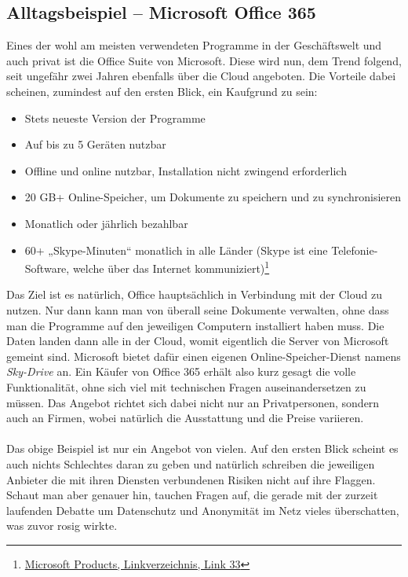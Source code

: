 \subsection{Alltagsbeispiel – Microsoft Office 365}
Eines der wohl am meisten verwendeten Programme in der Geschäftswelt und auch privat ist die Office Suite von Microsoft. Diese wird nun, dem Trend folgend, seit ungefähr zwei Jahren ebenfalls über die Cloud angeboten. Die Vorteile dabei scheinen, zumindest auf den ersten Blick, ein Kaufgrund zu sein:

\begin{itemize}
\item Stets neueste Version der Programme
\item Auf bis zu 5 Geräten nutzbar
\item Offline und online nutzbar, Installation nicht zwingend erforderlich
\item 20 GB+ Online-Speicher, um Dokumente zu speichern und zu synchronisieren
\item Monatlich oder jährlich bezahlbar
\item 60+ „Skype-Minuten“ monatlich in alle Länder (Skype ist eine Telefonie-Software, welche über das Internet kommuniziert)\footnote{\hyperlink{link33}{Microsoft Products, Linkverzeichnis, Link 33}}
\end{itemize}

Das Ziel ist es natürlich, Office hauptsächlich in Verbindung mit der Cloud zu nutzen. Nur dann kann man von überall seine Dokumente verwalten, ohne dass man die Programme auf den jeweiligen Computern installiert haben muss. Die Daten landen dann alle in der Cloud, womit eigentlich die Server von Microsoft gemeint sind. Microsoft bietet dafür einen eigenen Online-Speicher-Dienst namens \textit{Sky-Drive} an. Ein Käufer von Office 365 erhält also kurz gesagt die volle Funktionalität, ohne sich viel mit technischen Fragen auseinandersetzen zu müssen. Das Angebot richtet sich dabei nicht nur an Privatpersonen, sondern auch an Firmen, wobei natürlich die Ausstattung und die Preise variieren.
\\
\\
Das obige Beispiel ist nur ein Angebot von vielen. Auf den ersten Blick scheint es auch nichts Schlechtes daran zu geben und natürlich schreiben die jeweiligen Anbieter die mit ihren Diensten verbundenen Risiken nicht auf ihre Flaggen. Schaut man aber genauer hin, tauchen Fragen auf, die gerade mit der zurzeit laufenden Debatte um Datenschutz und Anonymität im Netz vieles überschatten, was zuvor rosig wirkte.

